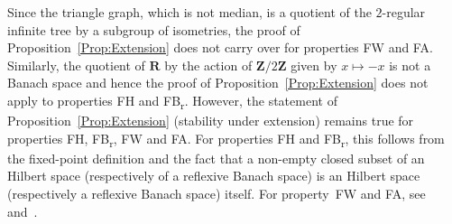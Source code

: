 \documentclass[a4paper]{article}
\theoremstyle{definition}
\newcommand*{\field}[1]{\mathbf{#1}}
\newcommand*{\Z}{\field{Z}}
\newcommand*{\R}{\field{R}}
\newcommand*{\FB}{FB\textsubscript{r}}
\newcommand*{\FH}{FH}
\newcommand*{\FW}{FW}
\newcommand*{\FA}{FA}
\begin{document}
%
%
Since the triangle graph, which is not median, is a quotient of the $2$-regular infinite tree by a subgroup of isometries, the proof of Proposition~\ref{Prop:Extension} does not carry over for properties \FW{} and \FA.
Similarly, the quotient of $\R$ by the action of $\Z/2\Z$ given by $x\mapsto-x$ is not a Banach space and hence the proof of Proposition~\ref{Prop:Extension} does not apply to properties \FH{} and \FB.
However, the statement of Proposition~\ref{Prop:Extension} (stability under extension) remains true for properties \FH, \FB, \FW{} and \FA.
For properties \FH{} and \FB, this follows from the fixed-point definition and the fact that a non-empty closed subset of an Hilbert space (respectively of a reflexive Banach space) is an Hilbert space (respectively a reflexive Banach space) itself.
For property~\FW{} and \FA, see~\cite[Proposition 5.B.3]{Cornulier2013} and~\cite{MR0476875}.
\end{document}
